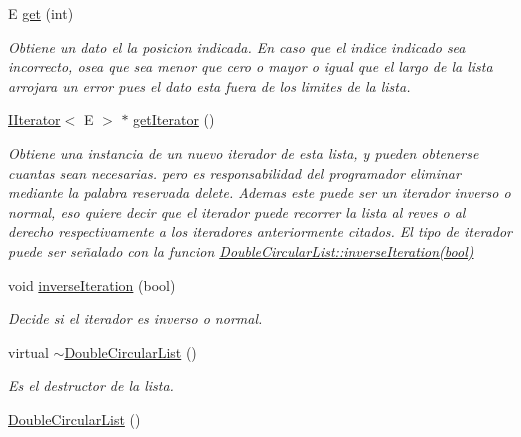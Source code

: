 \begin{DoxyCompactItemize}
E \hyperlink{class_double_circular_list_aa00bc8fd524af1ba208f85d8816dec52}{get} (int)
\begin{DoxyCompactList}\small\item\em Obtiene un dato el la posicion indicada. En caso que el indice indicado sea incorrecto, osea que sea menor que cero o mayor o igual que el largo de la lista arrojara un error pues el dato esta fuera de los limites de la lista. \end{DoxyCompactList}\item 
\hyperlink{class_i_iterator}{I\-Iterator}$<$ E $>$ $\ast$ \hyperlink{class_double_circular_list_abba1430e956c7660a88f786bfd8d87ad}{get\-Iterator} ()
\begin{DoxyCompactList}\small\item\em Obtiene una instancia de un nuevo iterador de esta lista, y pueden obtenerse cuantas sean necesarias. pero es responsabilidad del programador eliminar mediante la palabra reservada delete. Ademas este puede ser un iterador inverso o normal, eso quiere decir que el iterador puede recorrer la lista al reves o al derecho respectivamente a los iteradores anteriormente citados. El tipo de iterador puede ser señalado con la funcion \hyperlink{class_double_circular_list_a77212c5d6ad148c99a06009a8c44128b}{Double\-Circular\-List\-::inverse\-Iteration(bool)}\end{DoxyCompactList}\item 
void \hyperlink{class_double_circular_list_a77212c5d6ad148c99a06009a8c44128b}{inverse\-Iteration} (bool)
\begin{DoxyCompactList}\small\item\em Decide si el iterador es inverso o normal. \end{DoxyCompactList}\item 
virtual \hyperlink{class_double_circular_list_a26dba8b85983742cfbf38886245fe2a4}{$\sim$\-Double\-Circular\-List} ()
\begin{DoxyCompactList}\small\item\em Es el destructor de la lista. \end{DoxyCompactList}\item 
\hyperlink{class_double_circular_list_a533876254e3c837d556542eda9968f8b}{Double\-Circular\-List} ()
\end{DoxyCompactItemize}
